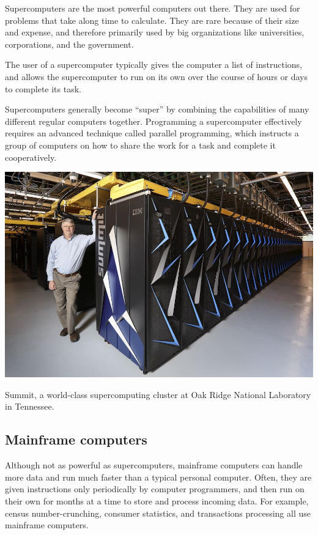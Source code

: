 Supercomputers are the most powerful computers out there. They are used for problems that take along time to calculate. They are rare because of their size and expense, and therefore primarily used by big organizations like universities, corporations, and the government.

The user of a supercomputer typically gives the computer a list of instructions, and allows the supercomputer to run on its own over the course of hours or days to complete its task.

Supercomputers generally become ``super'' by combining the capabilities of many different regular computers together. Programming a supercomputer effectively requires an advanced technique called parallel programming, which instructs a group of computers on how to share the work for a task and complete it cooperatively.

\begin{marginfigure}
	\centering
	\includegraphics[width=\textwidth]{images/supercomputer.jpg}
	\caption{Summit, a world-class supercomputing cluster at Oak Ridge National Laboratory in Tennessee.}
	\label{fig:supercomputer}
\end{marginfigure}

\subsection{Mainframe computers}
Although not as powerful as supercomputers, mainframe computers can handle more data and run much faster than a typical personal computer. Often, they are given instructions only periodically by computer programmers, and then run on their own for months at a time to store and process incoming data. For example, census number-crunching, consumer statistics, and transactions processing all use mainframe computers.

